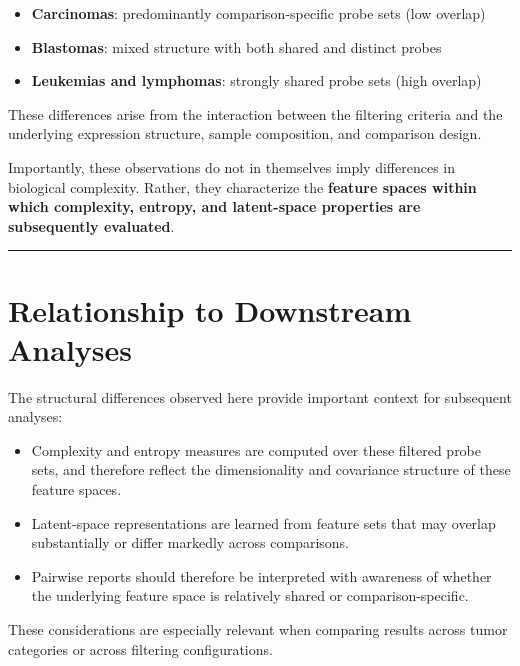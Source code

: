 \documentclass[
  letterpaper,
  DIV=11,
  numbers=noendperiod,
  openany,
  oneside]{scrreprt}
\providecommand{\tightlist}{%
  \setlength{\itemsep}{0pt}\setlength{\parskip}{0pt}}
\begin{document}
\begin{itemize}
\tightlist
\item
  \textbf{Carcinomas}: predominantly comparison-specific probe sets (low
  overlap)\\
\item
  \textbf{Blastomas}: mixed structure with both shared and distinct
  probes\\
\item
  \textbf{Leukemias and lymphomas}: strongly shared probe sets (high
  overlap)
\end{itemize}

These differences arise from the interaction between the filtering
criteria and the underlying expression structure, sample composition,
and comparison design.

Importantly, these observations do not in themselves imply differences
in biological complexity. Rather, they characterize the \textbf{feature
spaces within which complexity, entropy, and latent-space properties are
subsequently evaluated}.

\begin{center}\rule{0.5\linewidth}{0.5pt}\end{center}

\section{Relationship to Downstream
Analyses}\label{relationship-to-downstream-analyses}

The structural differences observed here provide important context for
subsequent analyses:

\begin{itemize}
\tightlist
\item
  Complexity and entropy measures are computed over these filtered probe
  sets, and therefore reflect the dimensionality and covariance
  structure of these feature spaces.
\item
  Latent-space representations are learned from feature sets that may
  overlap substantially or differ markedly across comparisons.
\item
  Pairwise reports should therefore be interpreted with awareness of
  whether the underlying feature space is relatively shared or
  comparison-specific.
\end{itemize}

These considerations are especially relevant when comparing results
across tumor categories or across filtering configurations.
\end{document}
